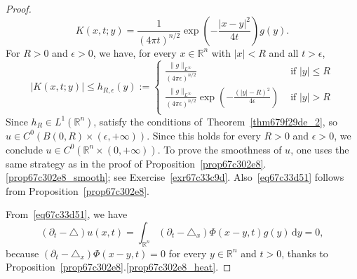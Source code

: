 \documentclass[a4paper,9pt]{amsart}
\newcommand{\R}{\mathbb{R}}	%
\newcommand{\did}{\,\mathrm{d}}	%
\newcommand{\de}{\partial}		%
\newcommand{\laplacian}{\triangle}
\theoremstyle{plain}
\theoremstyle{definition}
\theoremstyle{remark}
\begin{document}
\begin{proof}
	\[
	K(x,t;y) = \frac1{(4\pi t)^{n/2}} \exp\left( -\frac{|x-y|^2}{4t} \right) g(y) .
	\]
	For $R>0$ and $\epsilon>0$, we have, for every $x\in\R^n$ with $|x|< R$ and all $t>\epsilon$,
	\[
	|K(x,t;y)|\le h_{R,\epsilon}(y)
	:= \begin{cases}
	\frac{\|g\|_{L^\infty}}{(4\pi \epsilon)^{n/2}} & \text{ if }|y|\le R \\
	\frac{\|g\|_{L^\infty}}{(4\pi \epsilon)^{n/2}} \exp\left( -\frac{(|y|-R)^2}{4 \epsilon} \right) & \text{ if }|y| > R \\
	\end{cases}
	\]
	Since $h_R\in L^1(\R^n)$, satisfy the conditions of~Theorem~\ref{thm679f29de_2}, so $u\in C^0(B(0,R)\times (\epsilon,+\infty))$.
	Since this holds for every $R>0$ and $\epsilon>0$, we conclude $u\in C^0(\R^n\times (0,+\infty))$.
	To prove the smoothness of $u$, one uses the same strategy as in the proof of Proposition~\ref{prop67c302e8}.\ref{prop67c302e8_smooth};
	see Exercise~\ref{exr67c33c9d}.
	Also~\eqref{eq67c33d51} follows from Proposition~\ref{prop67c302e8}.
	
	From~\eqref{eq67c33d51}, we have
	\begin{equation}
		(\de_t-\laplacian)u(x,t) 
		= \int_{\R^n} (\de_t-\laplacian_x)\Phi(x-y,t) g(y) \did y 
		= 0 ,
	\end{equation}
	because $(\de_t-\laplacian_x)\Phi(x-y,t) = 0$ for every $y\in\R^n$ and $t>0$,
	thanks to Proposition~\ref{prop67c302e8}.\ref{prop67c302e8_heat}.
	

\end{proof}
\end{document}
